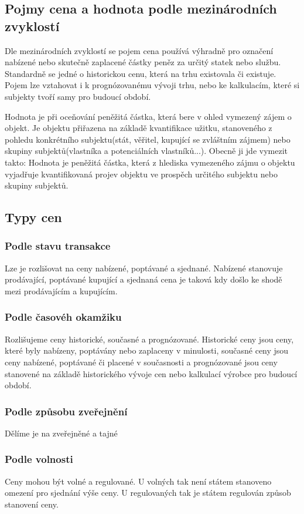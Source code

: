 \subsection{Pojmy cena a hodnota podle mezinárodních zvyklostí}
Dle mezinárodních zvyklostí se pojem cena používá výhradně pro označení nabízené nebo skutečně zaplacené částky peněz za určitý statek nebo službu.
Standardně se jedné o historickou cenu, která na trhu existovala či existuje. Pojem lze vztahovat i k prognózovanému vývoji trhu, nebo ke kalkulacím, 
které si subjekty tvoří samy pro budoucí období.

Hodnota je při oceňování peněžitá částka, která bere v ohled vymezený zájem o objekt. Je objektu přiřazena na základě kvantifikace užitku, stanoveného z 
pohledu konkrétního subjektu(stát, věřitel, kupující se zvláštním zájmem) nebo skupiny subjektů(vlastníka a potenciálních vlastníků...). Obecně ji jde vymezit
takto: Hodnota je peněžitá částka, která z hlediska vymezeného zájmu o objektu vyjadřuje kvantifikovaná projev objektu ve prospěch určitého subjektu nebo skupiny subjektů.

\subsection{Typy cen}
\subsubsection*{Podle stavu transakce}
Lze je rozlišovat na ceny nabízené, poptávané a sjednané. Nabízené stanovuje prodávající, poptávané kupující a sjednaná cena je taková kdy došlo ke 
shodě mezi prodávajícím a kupujícím.
\subsubsection*{Podle časovéh okamžiku}
Rozlišujeme ceny historické, současné a prognózované. Historické ceny jsou ceny, které byly nabízeny, poptávány nebo zaplaceny v minulosti, 
současné ceny jsou ceny nabízené, poptávané či placené v současnosti a prognózované jsou ceny stanovené na základě historického vývoje cen nebo kalkulací
výrobce pro budoucí období.
\subsubsection*{Podle způsobu zveřejnění}
Dělíme je na zveřejněné a tajné
\subsubsection*{Podle volnosti}
Ceny mohou být volné a regulované. U volných tak není státem stanoveno omezení pro sjednání výše ceny. U regulovaných tak je státem regulován způsob stanovení
ceny. 
